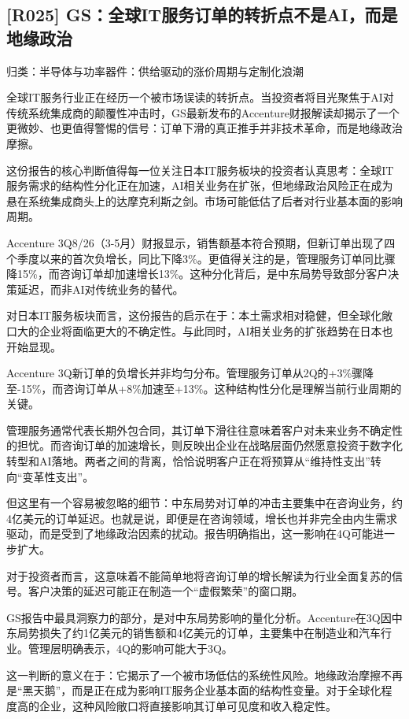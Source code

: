 \documentclass[11pt]{ctexart}
\begin{document}
\subsection{[R025] GS：全球IT服务订单的转折点不是AI，而是地缘政治}
{\small\color{refgray}归类：半导体与功率器件：供给驱动的涨价周期与定制化浪潮}

全球IT服务行业正在经历一个被市场误读的转折点。当投资者将目光聚焦于AI对传统系统集成商的颠覆性冲击时，GS最新发布的Accenture财报解读却揭示了一个更微妙、也更值得警惕的信号：订单下滑的真正推手并非技术革命，而是地缘政治摩擦。

这份报告的核心判断值得每一位关注日本IT服务板块的投资者认真思考：全球IT服务需求的结构性分化正在加速，AI相关业务在扩张，但地缘政治风险正在成为悬在系统集成商头上的达摩克利斯之剑。市场可能低估了后者对行业基本面的影响周期。

Accenture 3Q8/26（3-5月）财报显示，销售额基本符合预期，但新订单出现了四个季度以来的首次负增长，同比下降3\%。更值得关注的是，管理服务订单同比骤降15\%，而咨询订单却加速增长13\%。这种分化背后，是中东局势导致部分客户决策延迟，而非AI对传统业务的替代。

对日本IT服务板块而言，这份报告的启示在于：本土需求相对稳健，但全球化敞口大的企业将面临更大的不确定性。与此同时，AI相关业务的扩张趋势在日本也开始显现。

Accenture 3Q新订单的负增长并非均匀分布。管理服务订单从2Q的+3\%骤降至-15\%，而咨询订单从+8\%加速至+13\%。这种结构性分化是理解当前行业周期的关键。

管理服务通常代表长期外包合同，其订单下滑往往意味着客户对未来业务不确定性的担忧。而咨询订单的加速增长，则反映出企业在战略层面仍然愿意投资于数字化转型和AI落地。两者之间的背离，恰恰说明客户正在将预算从“维持性支出”转向“变革性支出”。

但这里有一个容易被忽略的细节：中东局势对订单的冲击主要集中在咨询业务，约4亿美元的订单延迟。也就是说，即便是在咨询领域，增长也并非完全由内生需求驱动，而是受到了地缘政治因素的扰动。报告明确指出，这一影响在4Q可能进一步扩大。

对于投资者而言，这意味着不能简单地将咨询订单的增长解读为行业全面复苏的信号。客户决策的延迟可能正在制造一个“虚假繁荣”的窗口期。

GS报告中最具洞察力的部分，是对中东局势影响的量化分析。Accenture在3Q因中东局势损失了约1亿美元的销售额和4亿美元的订单，主要集中在制造业和汽车行业。管理层明确表示，4Q的影响可能大于3Q。

这一判断的意义在于：它揭示了一个被市场低估的系统性风险。地缘政治摩擦不再是“黑天鹅”，而是正在成为影响IT服务企业基本面的结构性变量。对于全球化程度高的企业，这种风险敞口将直接影响其订单可见度和收入稳定性。
\end{document}
